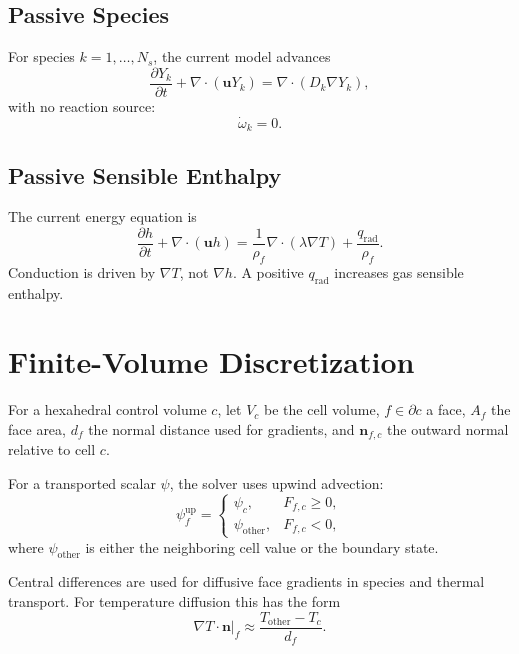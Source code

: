 \documentclass[11pt]{article}
\begin{document}
\subsection{Passive Species}

For species \(k=1,\ldots,N_s\), the current model advances
\begin{equation}
  \frac{\partial Y_k}{\partial t}
  +
  \nabla \cdot (\mathbf{u}Y_k)
  =
  \nabla \cdot (D_k \nabla Y_k),
\end{equation}
with no reaction source:
\begin{equation}
  \dot{\omega}_k = 0.
\end{equation}

\subsection{Passive Sensible Enthalpy}

The current energy equation is
\begin{equation}
  \frac{\partial h}{\partial t}
  +
  \nabla \cdot (\mathbf{u}h)
  =
  \frac{1}{\rho_f}
  \nabla \cdot (\lambda \nabla T)
  +
  \frac{q_{\mathrm{rad}}}{\rho_f}.
\end{equation}
Conduction is driven by \(\nabla T\), not \(\nabla h\).  A positive
\(q_{\mathrm{rad}}\) increases gas sensible enthalpy.

\section{Finite-Volume Discretization}

For a hexahedral control volume \(c\), let \(V_c\) be the cell volume,
\(f \in \partial c\) a face, \(A_f\) the face area, \(d_f\) the normal distance
used for gradients, and \(\mathbf{n}_{f,c}\) the outward normal relative to
cell \(c\).

For a transported scalar \(\psi\), the solver uses upwind advection:
\begin{equation}
  \psi_f^{\mathrm{up}} =
  \begin{cases}
    \psi_c, & F_{f,c} \ge 0, \\
    \psi_{\mathrm{other}}, & F_{f,c} < 0,
  \end{cases}
\end{equation}
where \(\psi_{\mathrm{other}}\) is either the neighboring cell value or the
boundary state.

Central differences are used for diffusive face gradients in species and
thermal transport.  For temperature diffusion this has the form
\begin{equation}
  \left.\nabla T \cdot \mathbf{n}\right|_f
  \approx
  \frac{T_{\mathrm{other}} - T_c}{d_f}.
\end{equation}
\end{document}
